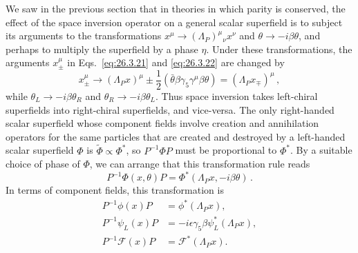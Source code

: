 We saw in the previous section that in theories in which parity is conserved,
the effect of the space inversion operator on a general scalar superfield is
to subject its arguments to the transformations
$x^\mu\rightarrow(\Lambda_P)^\mu{}_\nu x^\nu$ and
$\theta\rightarrow-i\beta\theta$, and perhaps to multiply the superfield by a
phase $\eta$. Under these transformations, the arguments $x_\pm^\mu$ in
Eqs.~\eqref{eq:26.3.21} and \eqref{eq:26.3.22} are changed by
\begin{equation}
  x_\pm^\mu\longrightarrow
  (\Lambda_Px)^\mu
  \pm\frac12(\bar\theta\beta\gamma_5\gamma^\mu\beta\theta)
  =(\Lambda_Px_\mp)^\mu\,,
  \tag{26.3.34}\label{eq:26.3.34}
\end{equation}
while $\theta_L\rightarrow-i\beta\theta_R$ and
$\theta_R\rightarrow-i\beta\theta_L$. Thus space inversion takes left-chiral
superfields into right-chiral superfields, and vice-versa. The only
right-handed scalar superfield whose component fields involve creation and
annihilation operators for the same particles that are created and destroyed
by a left-handed scalar superfield $\Phi$ is
$\widetilde{\Phi}\mathrel{\propto}\Phi^*$, so $P^{-1}\Phi P$ must be
proportional to $\Phi^*$. By a suitable choice of phase of $\Phi$, we can
arrange that this transformation rule reads
\begin{equation}
  P^{-1}\Phi(x,\theta)P
  =\Phi^*(\Lambda_Px,-i\beta\theta)\,.
  \tag{26.3.35}\label{eq:26.3.35}
\end{equation}
In terms of component fields, this transformation is
\begin{equation}
  \begin{aligned}
  P^{-1}\phi(x)P&=\phi^*(\Lambda_Px),\\
  P^{-1}\psi_L(x)P&=-i\epsilon\gamma_5\beta\psi_L^*(\Lambda_Px),\\
  P^{-1}\mathcal{F}(x)P&=\mathcal{F}^*(\Lambda_Px).
  \end{aligned}
  \tag{26.3.36}\label{eq:26.3.36}
\end{equation}

